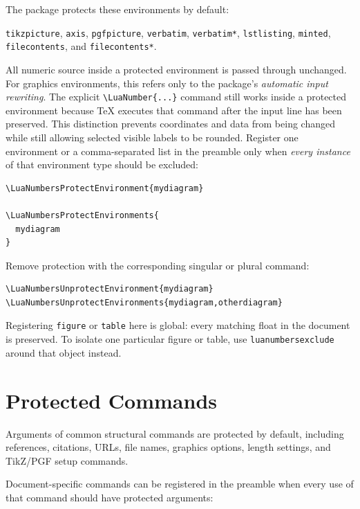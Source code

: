 \documentclass[11pt]{article}
\begin{document}
The package protects these environments by default:

\begin{center}
\texttt{tikzpicture}, \texttt{axis}, \texttt{pgfpicture},
\texttt{verbatim}, \texttt{verbatim*}, \texttt{lstlisting},
\texttt{minted}, \texttt{filecontents}, and \texttt{filecontents*}.
\end{center}

All numeric source inside a protected environment is passed through unchanged.
For graphics environments, this refers only to the package's \emph{automatic
input rewriting}. The explicit \verb|\LuaNumber{...}| command still works
inside a protected environment because TeX executes that command after the
input line has been preserved. This distinction prevents coordinates and data
from being changed while still allowing selected visible labels to be rounded.
Register one environment or a comma-separated list in the preamble only when
\emph{every instance} of that environment type should be excluded:

\begin{lstlisting}[style=latexinput]
\LuaNumbersProtectEnvironment{mydiagram}

\LuaNumbersProtectEnvironments{
  mydiagram
}
\end{lstlisting}

Remove protection with the corresponding singular or plural command:

\begin{lstlisting}[style=latexinput]
\LuaNumbersUnprotectEnvironment{mydiagram}
\LuaNumbersUnprotectEnvironments{mydiagram,otherdiagram}
\end{lstlisting}

\begin{importantnote}
Registering \texttt{figure} or \texttt{table} here is global: every matching
float in the document is preserved. To isolate one particular figure or table,
use \texttt{luanumbersexclude} around that object instead.
\end{importantnote}

\section{Protected Commands}

Arguments of common structural commands are protected by default, including
references, citations, URLs, file names, graphics options, length settings,
and TikZ/PGF setup commands.

Document-specific commands can be registered in the preamble when every use of
that command should have protected arguments:
\end{document}
